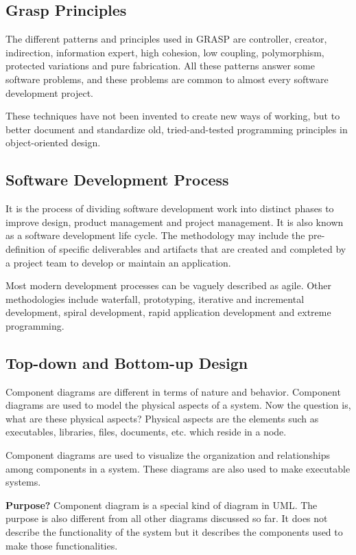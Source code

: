 \documentclass{article}
\begin{document}
		\subsection{Grasp Principles}
			The different patterns and principles used in GRASP are controller, creator, indirection, information expert, high cohesion, low coupling, polymorphism, protected variations and pure fabrication. All these patterns answer some software problems, and these problems are common to almost every software development project.

			These techniques have not been invented to create new ways of working, but to better document and standardize old, tried-and-tested programming principles in object-oriented design.

		\subsection{Software Development Process}
			It is the process of dividing software development work into distinct phases to improve design, product management and project management. It is also known as a software development life cycle. The methodology may include the pre-definition of specific deliverables and artifacts that are created and completed by a project team to develop or maintain an application.

			Most modern development processes can be vaguely described as agile. Other methodologies include waterfall, prototyping, iterative and incremental development, spiral development, rapid application development and extreme programming.

		\subsection{Top-down and Bottom-up Design}
			Component diagrams are different in terms of nature and behavior. Component diagrams are used to model the physical aspects of a system. Now the question is, what are these physical aspects? Physical aspects are the elements such as executables, libraries, files, documents, etc. which reside in a node.

			Component diagrams are used to visualize the organization and relationships among components in a system. These diagrams are also used to make executable systems.

			\textbf{Purpose?} Component diagram is a special kind of diagram in UML. The purpose is also different from all other diagrams discussed so far. It does not describe the functionality of the system but it describes the components used to make those functionalities.
\end{document}
